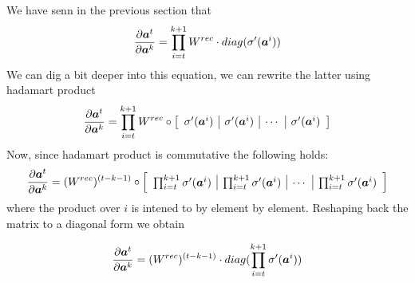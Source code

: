 We have senn in the previous section that
\begin{equation}
\frac{\partial \boldsymbol{a}^t}{\partial \boldsymbol{a}^k} = \prod_{i=t}^{k+1} W^{rec} \cdot diag(\sigma'(\boldsymbol{a}^i))
\end{equation}
We can dig a bit deeper into this equation, we can rewrite the latter using hadamart product
\begin{equation}
\frac{\partial \boldsymbol{a}^t}{\partial \boldsymbol{a}^k} = \prod_{i=t}^{k+1} W^{rec} \circ  
\left[
\begin{array}{c|c|c|c}
\sigma'(\boldsymbol{a}^i) & \sigma'(\boldsymbol{a}^i) & \cdots & \sigma'(\boldsymbol{a}^i) \\
\end{array}
\right]
\end{equation}
Now, since hadamart product is commutative the following holds:
\begin{equation}
\frac{\partial \boldsymbol{a}^t}{\partial \boldsymbol{a}^k} =  (W^{rec})^{(t-k-1)} \circ  
\left[
\begin{array}{c|c|c|c}
\prod_{i=t}^{k+1} \sigma'(\boldsymbol{a}^i) & \prod_{i=t}^{k+1} \sigma'(\boldsymbol{a}^i) & \cdots &  \prod_{i=t}^{k+1} \sigma'(\boldsymbol{a}^i) \\
\end{array}
\right]
\end{equation}
where the product over $i$ is intened to by element by element.
Reshaping back the matrix to a diagonal form we obtain

\begin{equation}
\frac{\partial \boldsymbol{a}^t}{\partial \boldsymbol{a}^k} = (W^{rec})^{(t-k-1)} \cdot diag(\prod_{i=t}^{k+1}\sigma'(\boldsymbol{a}^i))
\end{equation}